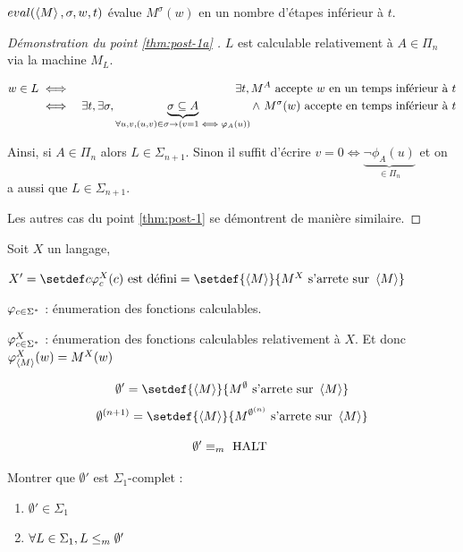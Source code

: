 \begin{definition}
	$eval(\left\langle M\right\rangle, \sigma,w,t)$ évalue $M^{\sigma}(w)$ en un nombre d'étapes inférieur à $t$.
\end{definition}

\begin{proof}[Démonstration du point \ref{thm:post-1a} \bimpRL]

	$L$ est calculable relativement à $A \in \Pi_n$ via la machine $M_L$.

	\begin{eqnarray*}
		w \in L &\iff& \exists t, M^A \text{ accepte } w \text{ en un temps inférieur à } t\\
		&\iff& \exists t, \exists \sigma,
		\underbrace{\sigma \subseteq A}_{\forall u,v, (u,v) \in \sigma \rightarrow (v=1 \iff \varphi_A(u))}
		\land\  M^{\sigma} (w) \text{ accepte en temps inférieur à }t
	\end{eqnarray*}

	Ainsi, si $A \in \Pi_n$ alors $L \in \Sigma_{n+1}$. Sinon il suffit d'écrire
	$v = 0 \iff \underbrace{\lnot \phi_A(u)}_{\in \Pi_n}$ et on a aussi que $L \in \Sigma_{n+1}$.

	Les autres cas du point \ref{thm:post-1} se démontrent de manière similaire.
\end{proof}

\begin{definition}
	Soit $X$ un langage,

	$X' = \setdef c {\phi_c^X(c) \text{ est défini}} = \setdef {\encode M} {M^X \text{ s'arrete sur } \encode M}$

	$\varphi_{c \in \Sigma^{*}}$ : énumeration des fonctions calculables.

	$\varphi_{c \in \Sigma^{*}}^X$ : énumeration des fonctions calculables relativement à $X$. Et donc $\varphi_{\left\langle M\right\rangle}^X(w) = M^X(w)$
\end{definition}

\begin{definition}
	$$\emptyset' = \setdef {\encode M} {M^{\emptyset} \text{ s'arrete sur } \encode M}$$
	$$\emptyset^{(n+1)} = \setdef {\encode M} {M^{\emptyset^{(n)}} \text{ s'arrete sur } \encode M} $$
\end{definition}


\begin{remarque}
	$$\emptyset' \equiv_m \text{ HALT }$$
\end{remarque}

\begin{exercice}
	Montrer que $\emptyset '$ est $\Sigma_1$-complet :
	\begin{enumerate}
		\item $\emptyset' \in \Sigma_1$
		\item $\forall L \in \Sigma_1, L \leq_m \emptyset'$
	\end{enumerate}
\end{exercice}


